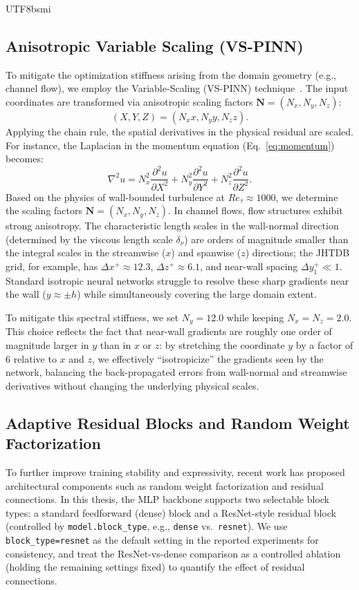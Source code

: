 \documentclass[master]{NTHUthesis}
\begin{document}
\begin{CJK*}{UTF8}{bsmi}
\subsection{Anisotropic Variable Scaling (VS-PINN)}
To mitigate the optimization stiffness arising from the domain geometry (e.g., channel flow), we employ the Variable-Scaling (VS-PINN) technique~\cite{Ko2025JCP}. The input coordinates are transformed via anisotropic scaling factors $\mathbf{N} = (N_x, N_y, N_z)$:
\begin{equation}
    (X, Y, Z) = (N_x x, N_y y, N_z z).
\end{equation}
Applying the chain rule, the spatial derivatives in the physical residual are scaled. For instance, the Laplacian in the momentum equation (Eq.~\eqref{eq:momentum}) becomes:
\begin{equation}
    \nabla^2 u = N_x^2 \frac{\partial^2 u}{\partial X^2} + N_y^2 \frac{\partial^2 u}{\partial Y^2} + N_z^2 \frac{\partial^2 u}{\partial Z^2}.
\end{equation}
Based on the physics of wall-bounded turbulence at $Re_\tau \approx 1000$, we determine the scaling factors $\mathbf{N} = (N_x, N_y, N_z)$.
In channel flows, flow structures exhibit strong anisotropy. The characteristic length scales in the wall-normal direction (determined by the viscous length scale $\delta_\nu$) are orders of magnitude smaller than the integral scales in the streamwise ($x$) and spanwise ($z$) directions; the JHTDB grid, for example, has $\Delta x^+ \approx 12.3$, $\Delta z^+ \approx 6.1$, and near-wall spacing $\Delta y_1^+ \ll 1$.
Standard isotropic neural networks struggle to resolve these sharp gradients near the wall ($y \approx \pm h$) while simultaneously covering the large domain extent.

To mitigate this spectral stiffness, we set $N_y = 12.0$ while keeping $N_x = N_z = 2.0$. 
This choice reflects the fact that near-wall gradients are roughly one order of magnitude larger in $y$ than in $x$ or $z$: by stretching the coordinate $y$ by a factor of 6 relative to $x$ and $z$, we effectively ``isotropicize'' the gradients seen by the network, balancing the back-propagated errors from wall-normal and streamwise derivatives without changing the underlying physical scales.

\subsection{Adaptive Residual Blocks and Random Weight Factorization}
\label{subsec:piratenet_components}
To further improve training stability and expressivity, recent work has proposed architectural components such as random weight factorization and residual connections. In this thesis, the MLP backbone supports two selectable block types: a standard feedforward (dense) block and a ResNet-style residual block (controlled by \texttt{model.block\_type}, e.g., \texttt{dense} vs.\ \texttt{resnet}). We use \texttt{block\_type=resnet} as the default setting in the reported experiments for consistency, and treat the ResNet-vs-dense comparison as a controlled ablation (holding the remaining settings fixed) to quantify the effect of residual connections.


\end{CJK*}
\end{document}
